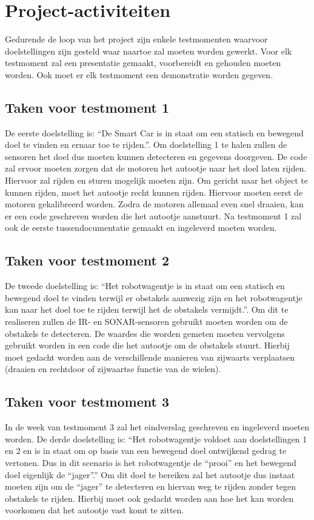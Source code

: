 \section{Project-activiteiten}
Gedurende de loop van het project zijn enkele testmomenten waarvoor doelstellingen zijn gesteld waar naartoe zal moeten worden gewerkt. Voor elk testmoment zal een presentatie gemaakt, voorbereidt en gehouden moeten worden. Ook moet er elk testmoment een demonstratie worden gegeven. 

\subsection{Taken voor testmoment 1}
De eerste doelstelling is: “De Smart Car is in staat om een statisch en bewegend doel te vinden en ernaar toe te rijden.”. Om doelstelling 1 te halen zullen de sensoren het doel dus moeten kunnen detecteren en gegevens doorgeven. De code zal ervoor moeten zorgen dat de motoren het autootje naar het doel laten rijden. Hiervoor zal rijden en sturen mogelijk moeten zijn. Om gericht naar het object te kunnen rijden, moet het autootje recht kunnen rijden. Hiervoor moeten eerst de motoren gekalibreerd worden. Zodra de motoren allemaal even snel draaien, kan er een code geschreven worden die het autootje aanstuurt. 
Na testmoment 1 zal ook de eerste tussendocumentatie gemaakt en ingeleverd moeten worden. 

\subsection{Taken voor testmoment 2}
De tweede doelstelling is: “Het robotwagentje is in staat om een statisch en bewegend doel te vinden terwijl er obstakels aanwezig zijn en het robotwagentje kan naar het doel toe te rijden terwijl het de obstakels vermijdt.”. Om dit te realiseren zullen de IR- en SONAR-sensoren gebruikt moeten worden om de obstakels te detecteren. De waardes die worden gemeten moeten vervolgens gebruikt worden in een code die het autootje om de obstakels stuurt. Hierbij moet gedacht worden aan de verschillende manieren van zijwaarts verplaatsen (draaien en rechtdoor of zijwaartse functie van de wielen).  

\subsection{Taken voor testmoment 3}
In de week van testmoment 3 zal het eindverslag geschreven en ingeleverd moeten worden. 
De derde doelstelling is: “Het robotwagentje voldoet aan doelstellingen 1 en 2 en is in staat om op basis van een bewegend doel ontwijkend gedrag te vertonen. Dus in dit scenario is het robotwagentje de “prooi” en het bewegend doel eigenlijk de “jager”.” Om dit doel te bereiken zal het autootje dus instaat moeten zijn om de “jager” te detecteren en hiervan weg te rijden zonder tegen obstakels te rijden. Hierbij moet ook gedacht worden aan hoe het kan worden voorkomen dat het autootje vast komt te zitten. 

